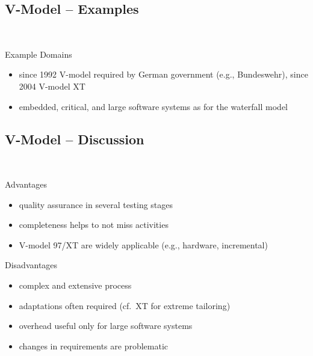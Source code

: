 \subsection{V-Model -- Examples}
\begin{frame}{\insertsubsection\ \mytitlesource{\ludewiglichter}}
	\begin{fancycolumns}[animation=none]
		\begin{example}{Example Domains}
			\begin{itemize}
				\item since 1992 V-model required by German government (e.g., Bundeswehr), since 2004 V-model XT
				\item embedded, critical, and large software systems as for the waterfall model
			\end{itemize}
		\end{example}
	\nextcolumn
	\end{fancycolumns}
\end{frame}

\subsection{V-Model -- Discussion}
\begin{frame}{\insertsubsection\ \mytitlesource{\ludewiglichter}}
	\begin{fancycolumns}
		\begin{note}{Advantages}
			\begin{itemize}
				\item quality assurance in several testing stages
				\item completeness helps to not miss activities
				\item V-model 97/XT are widely applicable (e.g., hardware, incremental)
			\end{itemize}
		\end{note}
		\nextcolumn
		\begin{note}{Disadvantages}
				\begin{itemize}
					\item complex and extensive process
					\item adaptations often required (cf.\ XT for extreme tailoring)
					\item overhead useful only for large software systems
					\item changes in requirements are problematic
				\end{itemize}
		\end{note}
	\end{fancycolumns}
\end{frame}

